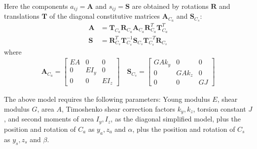 \documentclass[review]{elsarticle}
\def\amatr#1{{\boldsymbol{#1}}}
\begin{document}
Here the components $a_{ij}=\amatr{A}$ and $s_{ij}=\amatr{S}$ are obtained by rotations $\amatr{R}$ and translations $\amatr{T}$ of the diagonal constitutive matrices $\amatr{A}_{C_a}$ and $\amatr{S}_{C_s}$:
%
\begin{align}
\amatr{A} &= \amatr{T}_{C_a} \amatr{R}_{C_a} \amatr{A}_{C_a}  \amatr{R}_{C_a}^T \amatr{T}_{C_a}^T \\
\amatr{S} &= \amatr{R}_{C_s}^T \amatr{T}_{C_s}^{-1} \amatr{S}_{C_s}  \amatr{T}_{C_s}^{-T} \amatr{R}_{C_s}
\end{align}
%
where
% 
\begin{align}
\amatr{A}_{C_a} = 
	\left[  
	\begin{array}{ccc}
	 E A & 0 & 0 \\
	 0 & E I_y & 0 \\
	 0 & 0 & E I_z 
	\end{array}
	\right]
	\quad
	\amatr{S}_{C_s} = 
	\left[  
	\begin{array}{ccc}
	 G A k_y  & 0 & 0 \\
	 0 & G A k_z & 0 \\
	 0 & 0 & G J
	\end{array}
	\right]
\end{align}
	
The above model requires the following parameters: Young modulus $E$, shear modulus $G$, area $A$, Timoshenko shear correction factors $k_y,k_z$, torsion constant $J$, and second moments of area $I_y, I_z$, as the diagonal simplified model, plus the  position and rotation of $C_a$ as $y_a, z_a$ and $\alpha$, plus the position and rotation of $C_s$ as $y_s, z_s$ and $\beta$.

%

%

%
\end{document}
